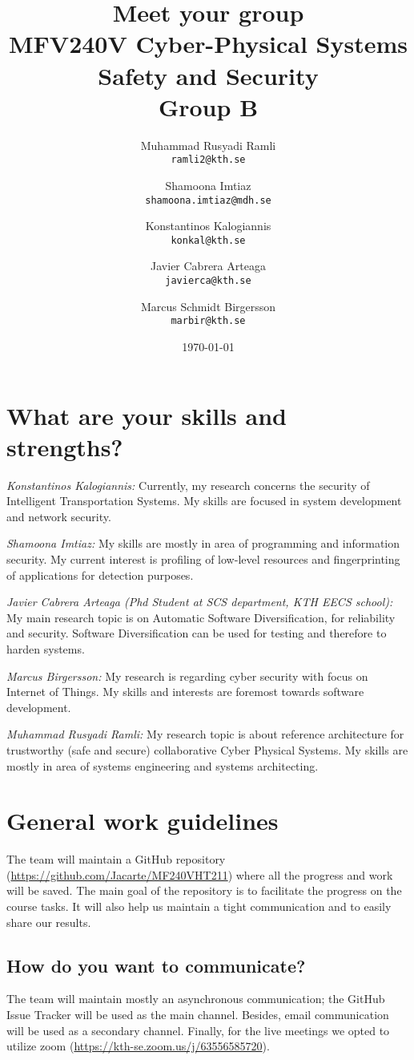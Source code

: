 \documentclass{article}
\title{Meet your group \\ \large MFV240V Cyber-Physical Systems Safety and Security \\ Group B}
\author{
  \and
  Muhammad Rusyadi Ramli\\
  \texttt{ramli2@kth.se}
  \and
  Shamoona Imtiaz\\
  \texttt{shamoona.imtiaz@mdh.se}
  \and
  Konstantinos Kalogiannis\\
  \texttt{konkal@kth.se}
  \and
  Javier Cabrera Arteaga\\
  \texttt{javierca@kth.se}
  \and
  Marcus Schmidt Birgersson\\
  \texttt{marbir@kth.se}
}
\date{\today}
\begin{document}
\maketitle


\section{What are your skills and strengths?}

\textit{Konstantinos Kalogiannis:} Currently, my research concerns the security of Intelligent Transportation Systems. My skills are focused in system development and network security.

\textit {Shamoona Imtiaz:} My skills are mostly in area of programming and information security. My current interest is profiling of low-level resources and fingerprinting of applications for detection purposes.

\textit{Javier Cabrera Arteaga (Phd Student at SCS department, KTH EECS school):} My main research topic is on Automatic Software Diversification, for reliability and security. Software Diversification can be used for testing and therefore to harden systems.

\textit {Marcus Birgersson:} My research is regarding cyber security with focus on Internet of Things. My skills and interests are foremost towards software development.

\textit {Muhammad Rusyadi Ramli:} My research topic is about reference architecture for trustworthy (safe and secure) collaborative Cyber Physical Systems. My skills are mostly in area of systems engineering and systems architecting.

\section{General work guidelines}

The team will maintain a GitHub repository (\url{https://github.com/Jacarte/MF240VHT211}) where all the progress and work will be saved. The main goal of the repository is to facilitate the progress on the course tasks. It will also help us maintain a tight communication and to easily share our results. 

\subsection{How do you want to communicate?}

The team will maintain mostly an asynchronous communication; the GitHub Issue Tracker will be used as the main channel. Besides, email communication will be used as a secondary channel. Finally, for the live meetings we opted to utilize zoom (\url{https://kth-se.zoom.us/j/63556585720}).
\end{document}
